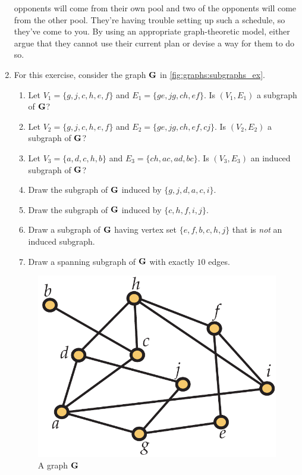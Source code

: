 \begin{enumerate}
  opponents will come from their own pool and two of the opponents
  will come from the other pool. They're having trouble setting up
  such a schedule, so they've come to you. By using an appropriate
  graph-theoretic model, either argue that they cannot use their
  current plan or devise a way for them to do so.
\item For this exercise, consider the graph $\mathbf{G}$ in
  \autoref{fig:graphs:subgraphs_ex}.
  \begin{enumerate}
  \item Let $V_1=\{g,j,c,h,e,f\}$ and $E_1=\{ge,jg,ch,ef\}$. Is
    $(V_1,E_1)$ a subgraph of $\mathbf{G}$?
  \item Let $V_2=\{g,j,c,h,e,f\}$ and $E_2=\{ge,jg,ch,ef,cj\}$. Is
    $(V_2,E_2)$ a subgraph of $\mathbf{G}$?
  \item Let $V_3=\{a,d,c,h,b\}$ and $E_3=\{ch,ac,ad,bc\}$. Is
    $(V_3,E_3)$ an induced subgraph of $\mathbf{G}$?
  \item Draw the subgraph of $\mathbf{G}$ induced by $\{g,j,d,a,c,i\}$.
  \item Draw the subgraph of $\mathbf{G}$ induced by $\{c,h,f,i,j\}$.
  \item Draw a subgraph of $\mathbf{G}$ having vertex set $\{e,f,b,c,h,j\}$
    that is \emph{not} an induced subgraph.
  \item Draw a spanning subgraph of $\mathbf{G}$ with exactly $10$ edges.
  \end{enumerate}
 \begin{figure}[h]
    \centering
    \includegraphics[scale=0.5]{graphs-figs/subgraphs_ex}
    \caption{A graph $\mathbf{G}$}
    \label{fig:graphs:subgraphs_ex}

\end{figure}
\end{enumerate}
